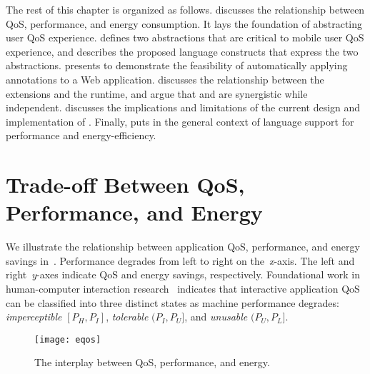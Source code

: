 The rest of this chapter is organized as follows.  discusses the relationship between QoS, performance, and energy consumption. It lays the foundation of abstracting user QoS experience.  defines two abstractions that are critical to mobile user QoS experience, and  describes the proposed \greenweb language constructs that express the two abstractions.  presents \autogreen to demonstrate the feasibility of automatically applying \greenweb annotations to a Web application.  discusses the relationship between the \greenweb extensions and the \webrt runtime, and argue that \greenweb and \webrt are synergistic while independent.  discusses the implications and limitations of the current design and implementation of \greenweb. Finally,  puts \greenweb in the general context of language support for performance and energy-efficiency.

\section{Trade-off Between QoS, Performance, and Energy}
\label{sec:lang:eqos}

We illustrate the relationship between application QoS, performance, and energy savings in~. Performance degrades from left to right on the~\textit{x}-axis. The left and right~\textit{y}-axes indicate QoS and energy savings, respectively. Foundational work in human-computer interaction research~\cite{eventlatency,designUI,info_vis,response_time,percent_done,usability_engineering} indicates that interactive application QoS can be classified into three distinct states as machine performance degrades: \textit{imperceptible} $[P_H,P_I]$, \textit{tolerable} $(P_I,P_U]$, and \textit{unusable} $(P_U,P_L]$.

\begin{figure}[t]
\centering
\captionsetup{width=.9\columnwidth}
\texttt{[image: eqos]}
\caption{The interplay between QoS, performance, and energy.}
\label{fig:eqos}
\end{figure}

